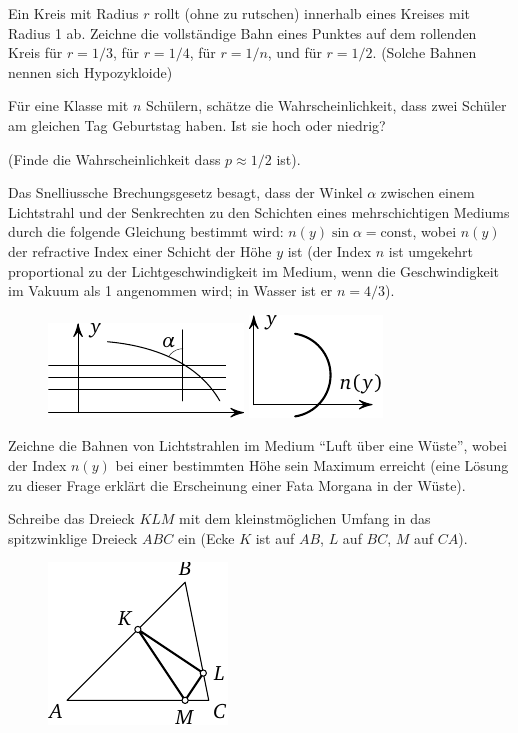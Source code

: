 \documentclass[12pt]{article} %
\begin{document}
\bigskip
{} Ein Kreis mit Radius $r$ rollt (ohne zu rutschen) innerhalb eines Kreises mit Radius 1 ab.
Zeichne die vollständige Bahn eines Punktes auf dem rollenden Kreis für $r=1/3$, für $r=1/4$, für $r=1/n$, und für $r=1/2$. (Solche Bahnen nennen sich Hypozykloide)

\bigskip
{} Für eine Klasse mit $n$ Schülern, schätze die Wahrscheinlichkeit, dass zwei Schüler am gleichen Tag Geburtstag haben. Ist sie hoch oder niedrig? 

\medskip
(Finde die Wahrscheinlichkeit dass $p \approx 1/2$ ist).

\bigskip
{} Das Snelliussche Brechungsgesetz besagt, dass der Winkel $\alpha$ zwischen einem Lichtstrahl und der Senkrechten zu den Schichten eines mehrschichtigen Mediums durch die folgende Gleichung bestimmt wird: $n(y) \sin \alpha=\text{const}$,
wobei $n(y)$ der refractive Index einer Schicht der Höhe $y$ ist (der Index $n$ ist umgekehrt proportional zu der Lichtgeschwindigkeit im Medium, wenn die Geschwindigkeit im Vakuum als 1 angenommen wird; in  Wasser ist er $n=4/3$).
\begin{figure}[h]
\centering
\includegraphics{taskbook-47}\hskip2cm
\includegraphics{taskbook-471}
\end{figure}

Zeichne die Bahnen von Lichtstrahlen im Medium “Luft über eine Wüste”, wobei der Index $n(y)$ bei einer bestimmten Höhe sein Maximum erreicht (eine Lösung zu dieser Frage erklärt die Erscheinung einer Fata Morgana in der Wüste).

\newpage
{} Schreibe das Dreieck $KLM$ mit dem kleinstmöglichen Umfang in das spitzwinklige Dreieck $ABC$ ein (Ecke $K$ ist auf $AB$, $L$ auf $BC$, $M$ auf $CA$).
\begin{figure}[h]
\centering
\includegraphics{taskbook-48} 
\end{figure}
\end{document}

